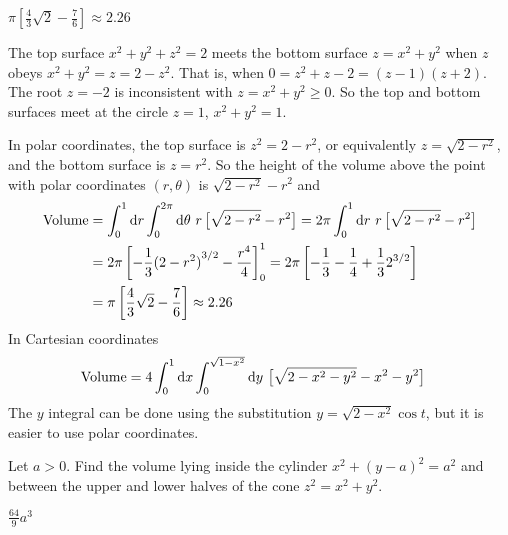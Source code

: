 \begin{answer}
$\pi \left[\frac{4}{3}\sqrt{2}-\frac{7}{6}\right] 
\approx 2.26$
\end{answer}

\begin{solution}
The top surface $x^2+y^2+z^2=2$ meets the bottom surface
$z=x^2+y^2$ when $z$ obeys $x^2+y^2=z=2-z^2$. That is, when 
$0=z^2+z-2=(z-1)(z+2)$. The root $z=-2$ is inconsistent with 
$z=x^2+y^2\ge 0$. So the top and bottom surfaces meet at the circle
$z=1$, $x^2+y^2=1$.

In polar coordinates, the top surface is $z^2=2-r^2$, or equivalently
$z=\sqrt{2-r^2}$, and the bottom surface is $z=r^2$. So the height of the volume
above the point with polar coordinates $(r,\theta)$ is
$\sqrt{2-r^2}-r^2$ and
\begin{align*}
\text{Volume}&=\int_0^1\dee{r}\int_0^{2\pi} \dee{\theta}\ r\,\big[\sqrt{2-r^2}-r^2\big]
=2\pi \int_0^1\dee{r}\ r\,\big[\sqrt{2-r^2}-r^2\big]\\
&=2\pi \left[-\frac{1}{3}{(2-r^2)}^{3/2}-\frac{r^4}{4}\right]_0^1
=2\pi \left[-\frac{1}{3}-\frac{1}{4}+\frac{1}{3}2^{3/2}\right] \\
&=\pi \left[\frac{4}{3}\sqrt{2}-\frac{7}{6}\right] 
\approx 2.26
\end{align*}
In Cartesian coordinates
\begin{align*}
\text{Volume}&=4\int_0^1\dee{x}\int_0^{\sqrt{1-x^2}} \dee{y}\ 
                       \big[\sqrt{2-x^2-y^2}-x^2-y^2\big]
\end{align*}
The $y$ integral can be done using the substitution $y=\sqrt{2-x^2}\cos t$,
but it is easier to use polar coordinates.
\end{solution}

\begin{question}
Let $a>0$.
Find the volume lying inside the cylinder $x^2+(y-a)^2=a^2$ 
and between the upper and lower halves of the cone $z^2=x^2+y^2$.
\end{question}

%

\begin{answer}
$\frac{64}{9}a^3$
\end{answer}

